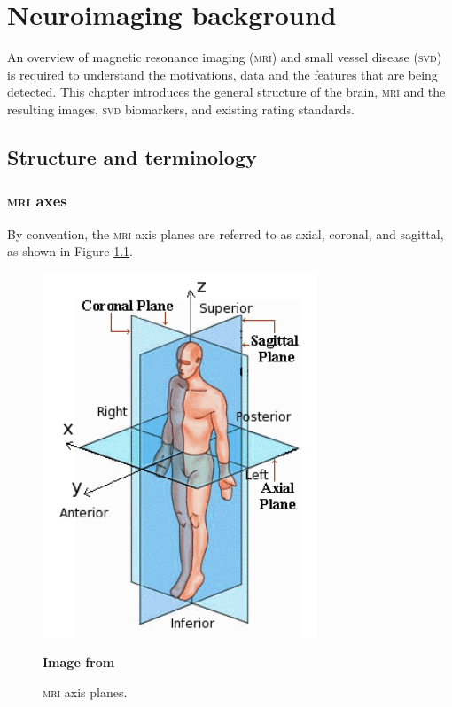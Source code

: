 %
%



\chapter{Neuroimaging background}\label{mri_svd_intro}

An overview of magnetic resonance imaging (\textsc{mri}) and small vessel disease (\textsc{svd}) is required to understand the motivations, data and the features that are being detected. This chapter introduces the general structure of the brain, \textsc{mri} and the resulting images, \textsc{svd} biomarkers, and existing rating standards.

\section{Structure and terminology}

\subsection*{\textsc{mri} axes}

By convention, the \textsc{mri} axis planes are referred to as axial, coronal, and sagittal, as shown in Figure \ref{svd-axes}.

\begin{figure}[ht]
	\centering
	\includegraphics[scale=0.8]{Images/2_axes.png}
	\caption{\textsc{mri} axis planes.}
	\small \textbf{Image from}
	\label{svd-axes}
\end{figure}

